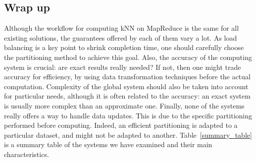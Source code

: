 \vspace{-0.25cm}
\subsection{Wrap up}
Although the workflow for computing kNN on MapReduce is the same for all existing solutions, the guarantees offered by each of them vary a lot. As load 
balancing is a key point to shrink completion time, one should carefully choose the partitioning method to achieve this goal. Also, the accuracy of the 
computing system is crucial: are exact results really needed? If not, then one might trade accuracy for efficiency, by using data transformation 
techniques before the actual computation. 
Complexity of the global system should also be taken into account for particular needs, although it is often related to the accuracy: an exact system is 
usually more complex than an approximate one.
Finally, none of the systems really offers a way to handle data updates. This is due to the specific partitioning performed before computing. Indeed, an 
efficient partitioning is adapted to a particular dataset, and might not be adapted to another.
Table~\ref{summary_table} is a summary table of the systems we have examined and their main characteristics.

